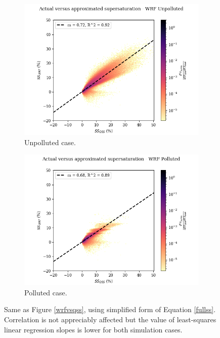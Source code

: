 \documentclass{article}
\begin{document}
\begin{figure}[ht]
	\centering
	\begin{subfigure}{0.7\textwidth}
		\includegraphics[width=\textwidth]{wrf/simpleqss_heatmap_ss_qss_vs_ss_wrf_Unpolluted_figure.png}
		\caption{Unpolluted case.}
		\label{simpleqsswrfvsqssunpoll}
	\end{subfigure}
	\begin{subfigure}{0.7\textwidth}
		\includegraphics[width=\textwidth]{wrf/simpleqss_heatmap_ss_qss_vs_ss_wrf_Polluted_figure.png}
		\caption{Polluted case.}
		\label{simpleqsswrfvsqsspoll}
	\end{subfigure}
	\caption{Same as Figure \ref{wrfvsqss}, using simplified form of Equation \ref{fullss}. Correlation is not appreciably affected but the value of least-squares linear regression slopes is lower for both simulation cases.}
	\label{simpleqsswrfvsqss}
\end{figure}
\end{document}
